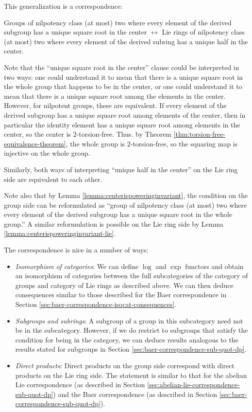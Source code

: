 This generalization is a correspondence:

Groups of nilpotency class (at most) two where every element of the
derived subgroup has a unique square root in the center
$\leftrightarrow$ Lie rings of nilpotency class (at most) two where
every element of the derived subring has a unique half in the center.

Note that the ``unique square root in the center'' clause could be
interpreted in two ways: one could understand it to mean that there is
a unique square root in the whole group that happens to be in the
center, or one could understand it to mean that there is a unique
square root among the elements in the center. However, for nilpotent
groups, these are equivalent. If every element of the derived subgroup
has a unique square root among elements of the center, then in
particular the identity element has a unique square root among
elements in the center, so the center is $2$-torsion-free. Thus. by
Theorem \ref{thm:torsion-free-equivalence-theorem}, the whole group is
$2$-torsion-free, so the squaring map is injective on the whole group.

Similarly, both ways of interpreting ``unique half in the center'' on
the Lie ring side are equivalent to each other.

Note also that by Lemma \ref{lemma:centerispoweringinvariant}, the
condition on the group side can be reformulated as ``group of
nilpotency class (at most) two where every element of the derived
subgroup has a unique square root in the whole group.'' A similar
reformulation is possible on the Lie ring side by Lemma
\ref{lemma:centerispoweringinvariant-lie}.

The correspondence is nice in a number of ways:

\begin{itemize}
\item {\em Isomorphism of categories}: We can define $\log$ and $\exp$
  functors and obtain an isomorphism of categories between the full
  subcategories of the category of groups and category of Lie rings as
  described above. We can then deduce consequences similar to those
  described for the Baer correspondence in Section
  \ref{sec:baer-correspondence-isocat-consequences}.
\item {\em Subgroups and subrings}: A subgroup of a group in this
  subcategory need not be in the subcategory. However, if we do
  restrict to subgroups that satisfy the condition for being in the
  category, we can deduce results analogous to the results stated for
  subgroups in Section \ref{sec:baer-correspondence-sub-quot-dp}.
\item {\em Direct products}: Direct products on the group side
  correspond with direct products on the Lie ring side. The statement
  is similar to that for the abelian Lie correspondence (as described
  in Section \ref{sec:abelian-lie-correspondence-sub-quot-dp}) and the
  Baer correspondence (as described in Section
  \ref{sec:baer-correspondence-sub-quot-dp}).
\end{itemize}


